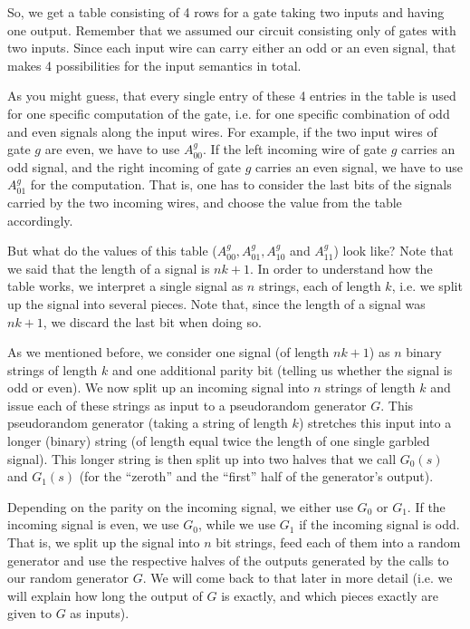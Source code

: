 So, we get a table consisting of 4 rows for a gate taking two inputs and having one output. Remember that we assumed our circuit consisting only of gates with two inputs. Since each input wire can carry either an odd or an even signal, that makes 4 possibilities for the input semantics in total.

As you might guess, that every single entry of these 4 entries in the table is used for one specific computation of the gate, i.e. for one specific combination of odd and even signals along the input wires. For example, if the two input wires of gate $g$ are even, we have to use $A_{00}^g$. If the left incoming wire of gate $g$ carries an odd signal, and the right incoming of gate $g$ carries an even signal, we have to use $A_{01}^g$ for the computation. That is, one has to consider the last bits of the signals carried by the two incoming wires, and choose the value from the table accordingly.

But what do the values of this table ($A^g_{00},A^g_{01},A^g_{10}$ and $A^g_{11}$) look like? Note that we said that the length of a signal is $nk+1$. In order to understand how the table works, we interpret a single signal as $n$ strings, each of length $k$, i.e. we split up the signal into several pieces. Note that, since the length of a signal was $nk+1$, we discard the last bit when doing so.

As we mentioned before, we consider one signal (of length $nk+1$) as $n$ binary strings of length $k$ and one additional parity bit (telling us whether the signal is odd or even). We now split up an incoming signal into $n$ strings of length $k$ and issue each of these strings as input to a pseudorandom generator $G$. This pseudorandom generator (taking a string of length $k$) stretches this input into a longer (binary) string (of length equal twice the length of one single garbled signal). This longer string is then split up into two halves that we call $G_0(s)$ and $G_1(s)$ (for the ``zeroth'' and the ``first'' half of the generator's output).

Depending on the parity on the incoming signal, we either use $G_0$ or $G_1$. If the incoming signal is even, we use $G_0$, while we use $G_1$ if the incoming signal is odd. That is, we split up the signal into $n$ bit strings, feed each of them into a random generator and use the respective halves of the outputs generated by the calls to our random generator $G$. We will come back to that later in more detail (i.e. we will explain how long the output of $G$ is exactly, and which pieces exactly are given to $G$ as inputs). 

